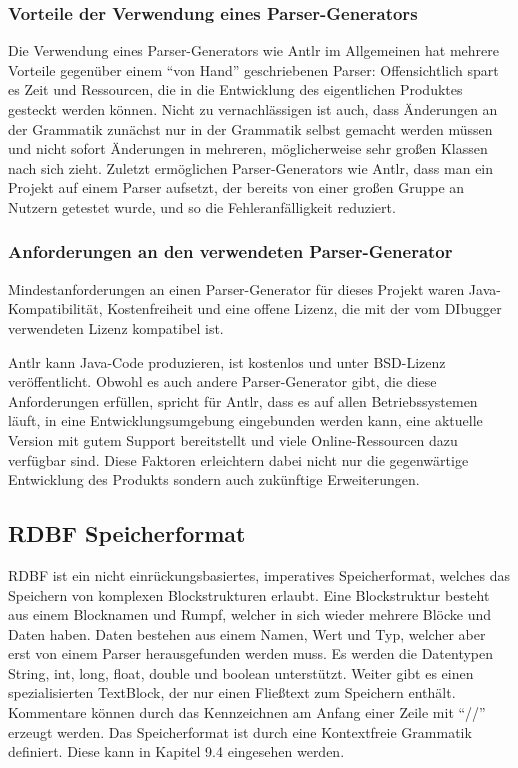 \documentclass[parskip=full]{scrartcl}
\begin{document}

\subsubsection{Vorteile der Verwendung eines Parser-Generators}
Die Verwendung eines Parser-Generators wie Antlr im Allgemeinen hat mehrere Vorteile gegenüber einem “von Hand” geschriebenen Parser: Offensichtlich spart es Zeit und Ressourcen, die in die Entwicklung des eigentlichen Produktes gesteckt werden können. Nicht zu vernachlässigen ist auch, dass Änderungen an der Grammatik zunächst nur in der Grammatik selbst gemacht werden müssen und nicht sofort Änderungen in mehreren, möglicherweise sehr großen Klassen nach sich zieht. Zuletzt ermöglichen Parser-Generators wie Antlr, dass man ein Projekt auf einem Parser aufsetzt, der bereits von einer großen Gruppe an Nutzern getestet wurde, und so die Fehleranfälligkeit reduziert.


\subsubsection{Anforderungen an den verwendeten Parser-Generator}

Mindestanforderungen an einen Parser-Generator für dieses Projekt waren Java-Kompatibilität, Kostenfreiheit und eine offene Lizenz, die mit der vom DIbugger verwendeten Lizenz kompatibel ist.

Antlr kann Java-Code produzieren, ist kostenlos und unter BSD-Lizenz veröffentlicht.
Obwohl es auch andere Parser-Generator gibt, die diese Anforderungen erfüllen, spricht für Antlr, dass es auf allen Betriebssystemen läuft, in eine Entwicklungsumgebung eingebunden werden kann, eine aktuelle Version mit gutem Support bereitstellt und viele Online-Ressourcen dazu verfügbar sind.
Diese Faktoren erleichtern dabei nicht nur die gegenwärtige Entwicklung des Produkts sondern auch zukünftige Erweiterungen.

\subsection{RDBF Speicherformat}
RDBF ist ein nicht einrückungsbasiertes, imperatives Speicherformat, welches das Speichern von komplexen Blockstrukturen erlaubt.
Eine Blockstruktur besteht aus einem Blocknamen und Rumpf, welcher in sich wieder mehrere Blöcke und Daten haben.
Daten bestehen aus einem Namen, Wert und Typ, welcher aber erst von einem Parser herausgefunden werden muss.
Es werden die Datentypen String, int, long, float, double und boolean unterstützt.
Weiter gibt es einen spezialisierten TextBlock, der nur einen Fließtext zum Speichern enthält.
Kommentare können durch das Kennzeichnen am Anfang einer Zeile mit \enquote{//} erzeugt werden.
Das Speicherformat ist durch eine Kontextfreie Grammatik definiert. Diese kann in Kapitel 9.4 eingesehen werden. 
\end{document}
